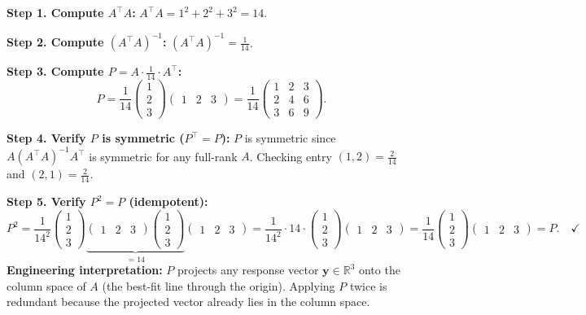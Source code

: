 \documentclass[12pt,a4paper]{article}
\begin{document}
\textbf{Step 1. Compute $A^\top A$:}
$A^\top A = 1^2 + 2^2 + 3^2 = 14$.

\textbf{Step 2. Compute $(A^\top A)^{-1}$:}
$(A^\top A)^{-1} = \tfrac{1}{14}$.

\textbf{Step 3. Compute $P = A \cdot \tfrac{1}{14} \cdot A^\top$:}
\[
  P = \frac{1}{14}\begin{pmatrix}1\\2\\3\end{pmatrix}\begin{pmatrix}1&2&3\end{pmatrix}
    = \frac{1}{14}\begin{pmatrix}
        1 & 2 & 3 \\
        2 & 4 & 6 \\
        3 & 6 & 9
      \end{pmatrix}.
\]

\textbf{Step 4. Verify $P$ is symmetric ($P^\top = P$):}
$P$ is symmetric since $A(A^\top A)^{-1}A^\top$ is symmetric for any full-rank $A$. Checking entry $(1,2) = \tfrac{2}{14}$ and $(2,1) = \tfrac{2}{14}$. \quad \checkmark

\textbf{Step 5. Verify $P^2 = P$ (idempotent):}
\[
  P^2 = \frac{1}{14^2}\begin{pmatrix}1\\2\\3\end{pmatrix}
        \underbrace{\begin{pmatrix}1&2&3\end{pmatrix}\begin{pmatrix}1\\2\\3\end{pmatrix}}_{=14}
        \begin{pmatrix}1&2&3\end{pmatrix}
      = \frac{1}{14^2} \cdot 14 \cdot \begin{pmatrix}1\\2\\3\end{pmatrix}\begin{pmatrix}1&2&3\end{pmatrix}
      = \frac{1}{14}\begin{pmatrix}1\\2\\3\end{pmatrix}\begin{pmatrix}1&2&3\end{pmatrix} = P. \quad \checkmark
\]
\textbf{Engineering interpretation:} $P$ projects any response vector $\mathbf{y} \in \mathbb{R}^3$ onto the column space of $A$ (the best-fit line through the origin).
Applying $P$ twice is redundant because the projected vector already lies in the column space.
\end{document}
